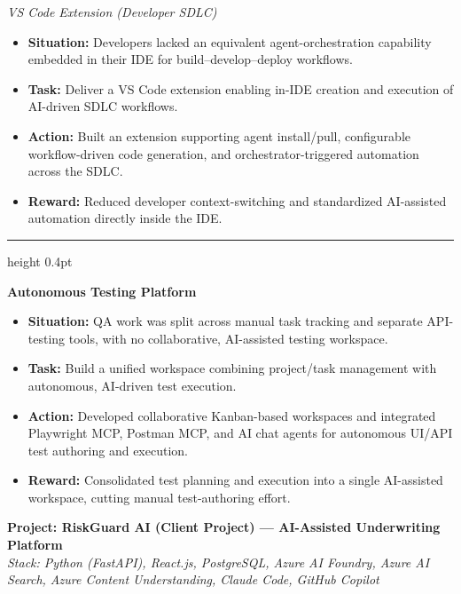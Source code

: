 \documentclass[a4paper,10pt]{article}
\newcommand{\projectdivider}{\vspace{4pt}\textcolor{dividercolor}{\hrule height 0.4pt}\vspace{4pt}}
\newcommand{\expblock}[1]{\noindent\textbf{#1}\par\vspace{1pt}}
\newcommand{\expsubblock}[1]{\noindent\textit{#1}\par\vspace{1pt}}
\begin{document}
\vspace{4pt}
\expsubblock{VS Code Extension (Developer SDLC)}
\begin{itemize}
\item \textbf{Situation:} Developers lacked an equivalent agent-orchestration capability embedded in their IDE for build–develop–deploy workflows.
\item \textbf{Task:} Deliver a VS Code extension enabling in-IDE creation and execution of AI-driven SDLC workflows.
\item \textbf{Action:} Built an extension supporting agent install/pull, configurable workflow-driven code generation, and orchestrator-triggered automation across the SDLC.
\item \textbf{Reward:} Reduced developer context-switching and standardized AI-assisted automation directly inside the IDE.
\end{itemize}

\projectdivider

\expblock{Autonomous Testing Platform}
\begin{itemize}
\item \textbf{Situation:} QA work was split across manual task tracking and separate API-testing tools, with no collaborative, AI-assisted testing workspace.
\item \textbf{Task:} Build a unified workspace combining project/task management with autonomous, AI-driven test execution.
\item \textbf{Action:} Developed collaborative Kanban-based workspaces and integrated Playwright MCP, Postman MCP, and AI chat agents for autonomous UI/API test authoring and execution.
\item \textbf{Reward:} Consolidated test planning and execution into a single AI-assisted workspace, cutting manual test-authoring effort.
\end{itemize}

\vspace{10pt}
\noindent\textbf{Project: RiskGuard AI (Client Project) — AI-Assisted Underwriting Platform}\\
\textit{Stack: Python (FastAPI), React.js, PostgreSQL, Azure AI Foundry, Azure AI Search, Azure Content Understanding, Claude Code, GitHub Copilot}
\end{document}
